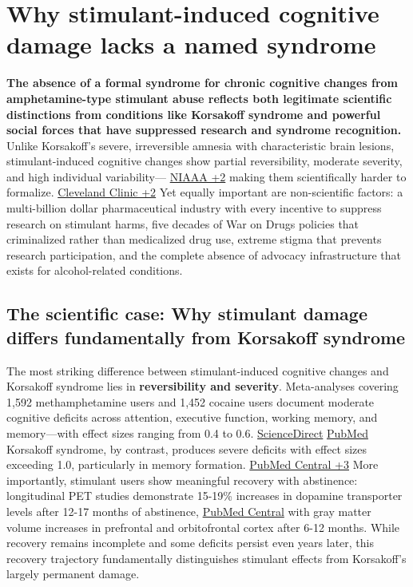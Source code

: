 ﻿\section{Why stimulant-induced cognitive damage lacks a named syndrome}\label{16_missing_syndrome-why-stimulant-induced-cognitive-damage-lacks-a-named-syndrome}

\textbf{The absence of a formal syndrome for chronic cognitive changes from amphetamine-type stimulant abuse reflects both legitimate scientific distinctions from conditions like Korsakoff syndrome and powerful social forces that have suppressed research and syndrome recognition.} Unlike Korsakoff's severe, irreversible amnesia with characteristic brain lesions, stimulant-induced cognitive changes show partial reversibility, moderate severity, and high individual variability--- \href{https://www.niaaa.nih.gov/publications/brochures-and-fact-sheets/wernicke-korsakoff-syndrome}{NIAAA +2} making them scientifically harder to formalize. \href{https://my.clevelandclinic.org/health/diseases/22687-wernicke-korsakoff-syndrome}{Cleveland Clinic +2} Yet equally important are non-scientific factors: a multi-billion dollar pharmaceutical industry with every incentive to suppress research on stimulant harms, five decades of War on Drugs policies that criminalized rather than medicalized drug use, extreme stigma that prevents research participation, and the complete absence of advocacy infrastructure that exists for alcohol-related conditions.

\subsection{The scientific case: Why stimulant damage differs fundamentally from Korsakoff syndrome}\label{16_missing_syndrome-the-scientific-case-why-stimulant-damage-differs-fundamentally-from-korsakoff-syndrome}

The most striking difference between stimulant-induced cognitive changes and Korsakoff syndrome lies in \textbf{reversibility and severity}. Meta-analyses covering 1,592 methamphetamine users and 1,452 cocaine users document moderate cognitive deficits across attention, executive function, working memory, and memory---with effect sizes ranging from 0.4 to 0.6. \href{https://www.sciencedirect.com/science/article/abs/pii/S030646031830025X}{ScienceDirect} \href{https://pubmed.ncbi.nlm.nih.gov/29407687/}{PubMed} Korsakoff syndrome, by contrast, produces severe deficits with effect sizes exceeding 1.0, particularly in memory formation. \href{https://pmc.ncbi.nlm.nih.gov/articles/PMC5708199/}{PubMed Central +3} More importantly, stimulant users show meaningful recovery with abstinence: longitudinal PET studies demonstrate 15-19\% increases in dopamine transporter levels after 12-17 months of abstinence, \href{https://pmc.ncbi.nlm.nih.gov/articles/PMC6763886/}{PubMed Central} with gray matter volume increases in prefrontal and orbitofrontal cortex after 6-12 months. While recovery remains incomplete and some deficits persist even years later, this recovery trajectory fundamentally distinguishes stimulant effects from Korsakoff's largely permanent damage.

